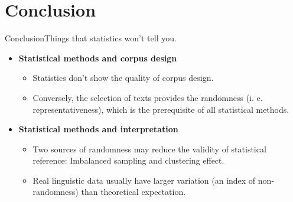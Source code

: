 %
%
%

\section{Conclusion}
\begin{frame}[t]{Conclusion}{Things that statistics won't tell you.}
	\begin{itemize}
		
		\item \textbf{Statistical methods and corpus design}
		\begin{itemize}
			\item Statistics don't show the quality of corpus design.
			\item Conversely, the selection of texts provides the randomness (i. e. representativeness), which is the prerequisite of all statistical methods. 
		\end{itemize}
		\bigbreak
		
		\item \textbf{Statistical methods and interpretation}
		\begin{itemize}
			\item Two sources of randomness may reduce the validity of statistical reference: Imbalanced sampling and clustering effect.
			\item Real linguistic data usually have larger variation (an index of non-randomness) than theoretical expectation. 
		\end{itemize}
		
	\end{itemize}
\end{frame}

